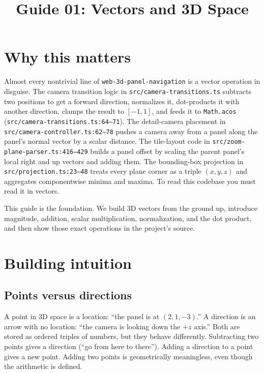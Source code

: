 \documentclass{article}
\title{Guide 01: Vectors and 3D Space}
\author{}
\date{}
\begin{document}
\maketitle

\section{Why this matters}

Almost every nontrivial line of \texttt{web-3d-panel-navigation} is a vector
operation in disguise. The camera transition logic in
\texttt{src/camera-transitions.ts} subtracts two positions to get a forward
direction, normalizes it, dot-products it with another direction, clamps the
result to $[-1,1]$, and feeds it to \texttt{Math.acos}
(\texttt{src/camera-transitions.ts:64--71}). The detail-camera placement in
\texttt{src/camera-controller.ts:62--78} pushes a camera away from a panel
along the panel's normal vector by a scalar distance. The tile-layout code in
\texttt{src/zoom-plane-parser.ts:416--429} builds a panel offset by scaling the
parent panel's local right and up vectors and adding them. The bounding-box
projection in \texttt{src/projection.ts:23--48} treats every plane corner as a
triple $(x, y, z)$ and aggregates componentwise minima and maxima. To read
this codebase you must read it in vectors.

This guide is the foundation. We build 3D vectors from the ground up,
introduce magnitude, addition, scalar multiplication, normalization, and the
dot product, and then show those exact operations in the project's source.

\section{Building intuition}

\subsection{Points versus directions}

A point in 3D space is a location: ``the panel is at $(2, 1, -3)$.'' A
direction is an arrow with no location: ``the camera is looking down the
$+z$ axis.'' Both are stored as ordered triples of numbers, but they behave
differently. Subtracting two points gives a direction (``go from here to
there''). Adding a direction to a point gives a new point. Adding two points
is geometrically meaningless, even though the arithmetic is defined.
\end{document}
